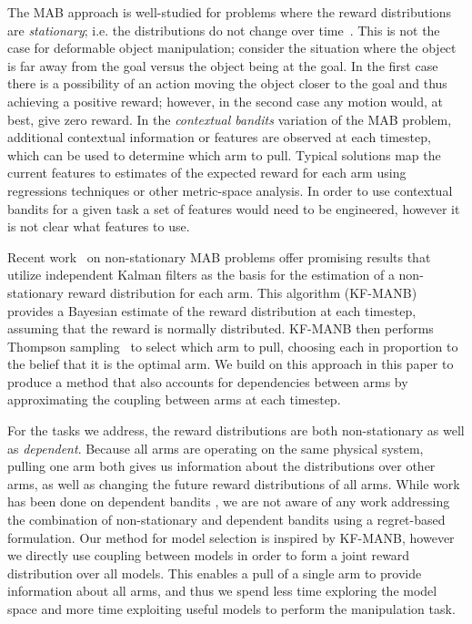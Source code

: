The MAB approach is well-studied for problems where the reward distributions are \textit{stationary}; i.e. the distributions do not change over time~\cite{Auer2002,Agrawal2012}. This is not the case for deformable object manipulation; consider the situation where the object is far away from the goal versus the object being at the goal. In the first case there is a possibility of an action moving the object closer to the goal and thus achieving a positive reward; however, in the second case any motion would, at best, give zero reward. In the \textit{contextual bandits} \cite{Langford2008,Slivkins2014} variation of the MAB problem, additional contextual information or features are observed at each timestep, which can be used to determine which arm to pull. Typical solutions map the current features to estimates of the expected reward for each arm using regressions techniques or other metric-space analysis. In order to use contextual bandits for a given task a set of features would need to be engineered, however it is not clear what features to use.

Recent work~\cite{Granmo2010} on non-stationary MAB problems offer promising results that utilize independent Kalman filters as the basis for the estimation of a non-stationary reward distribution for each arm. This algorithm (KF-MANB) provides a Bayesian estimate of the reward distribution at each timestep, assuming that the reward is normally distributed. KF-MANB then performs Thompson sampling~\cite{Agrawal2012} to select which arm to pull, choosing each in proportion to the belief that it is the optimal arm. We build on this approach in this paper to produce a method that also accounts for dependencies between arms by approximating the coupling between arms at each timestep.

For the tasks we address, the reward distributions are both non-stationary as well as \textit{dependent}. Because all arms are operating on the same physical system, pulling one arm both gives us information about the distributions over other arms, as well as changing the future reward distributions of all arms. While work has been done on dependent bandits \cite{Pandey2007,Langford2008}, we are not aware of any work addressing the combination of non-stationary and dependent bandits using a regret-based formulation. Our method for model selection is inspired by KF-MANB, however we directly use coupling between models in order to form a joint reward distribution over all models. This enables a pull of a single arm to provide information about all arms, and thus we spend less time exploring the model space and more time exploiting useful models to perform the manipulation task.
